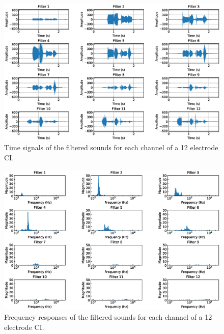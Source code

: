 \documentclass{scrartcl}			%
\begin{document}
\begin{figure}[H]
\centering
\includegraphics[width=\linewidth]{imgs/wav_results.eps}
    \caption{Time signals of the filtered sounds for each channel of a 12 electrode CI.} 
    \label{fig:sore_22} 
\end{figure}

\begin{figure}[H]
\centering
\includegraphics[width=\linewidth]{imgs/wav_results_fft.eps}
    \caption{Frequency responses of the filtered sounds for each channel of a 12 electrode CI.} 
    \label{fig:sore_22_fft} 
\end{figure}
\end{document}
